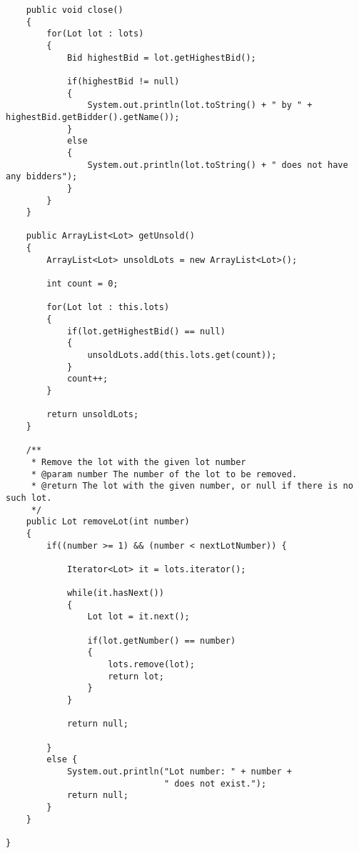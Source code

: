 \documentclass[10pt,a4paper]{article}
\begin{document}
\begin{lstlisting}
    public void close()
    {
        for(Lot lot : lots)
        {
            Bid highestBid = lot.getHighestBid();
            
            if(highestBid != null)
            {
                System.out.println(lot.toString() + " by " + highestBid.getBidder().getName());
            }
            else
            {
                System.out.println(lot.toString() + " does not have any bidders");
            }
        }
    }
    
    public ArrayList<Lot> getUnsold()
    {
        ArrayList<Lot> unsoldLots = new ArrayList<Lot>();
        
        int count = 0;
        
        for(Lot lot : this.lots)
        {
            if(lot.getHighestBid() == null)
            {
                unsoldLots.add(this.lots.get(count));
            }
            count++;
        }
        
        return unsoldLots;
    }
    
    /**
     * Remove the lot with the given lot number
     * @param number The number of the lot to be removed.
     * @return The lot with the given number, or null if there is no such lot.
     */
    public Lot removeLot(int number)
    {       
        if((number >= 1) && (number < nextLotNumber)) {
            
            Iterator<Lot> it = lots.iterator();
            
            while(it.hasNext())
            {
                Lot lot = it.next();
                
                if(lot.getNumber() == number)
                {
                    lots.remove(lot);
                    return lot;
                }
            }
            
            return null;
            
        }
        else {
            System.out.println("Lot number: " + number +
                               " does not exist.");
            return null;
        }
    }
    
}
\end{lstlisting}
\newpage
\end{document}

